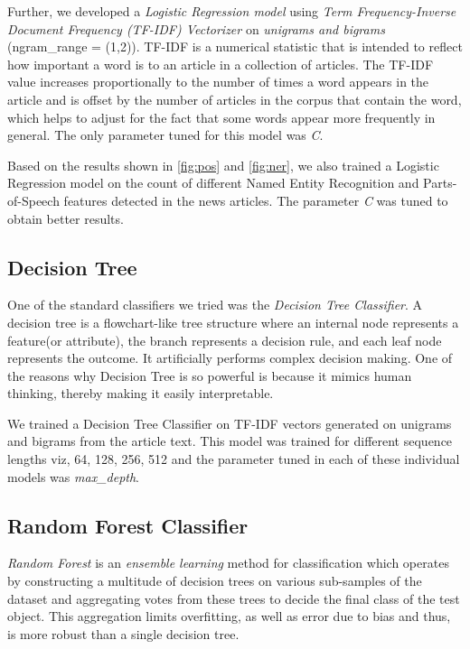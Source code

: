 \documentclass[11pt]{article}
\begin{document}
\medskip
Further, we developed a \textit{Logistic Regression model} using \textit{Term Frequency-Inverse Document Frequency (TF-IDF) Vectorizer} on \textit{unigrams and bigrams} (ngram\_range = (1,2)). TF-IDF is a numerical statistic that is intended to reflect how important a word is to an article in a collection of articles. The TF-IDF value increases proportionally to the number of times a word appears in the article and is offset by the number of articles in the corpus that contain the word, which helps to adjust for the fact that some words appear more frequently in general. The only parameter tuned for this model was \textit{C}.

\medskip
Based on the results shown in \ref{fig:pos} and \ref{fig:ner}, we also trained a Logistic Regression model on the count of different Named Entity 
Recognition and Parts-of-Speech features detected in the news articles. The parameter \textit{C} was tuned to obtain better results.

\subsection{Decision Tree}
One of the standard classifiers we tried was the \textit{Decision Tree Classifier}. A decision tree is a flowchart-like tree structure where an internal node represents a feature(or attribute), the branch represents a decision rule, and each leaf node represents the outcome. It artificially  performs complex decision making. One of the reasons why Decision Tree is so powerful is because it mimics human thinking, thereby making it easily interpretable.

\medskip
We trained a Decision Tree Classifier on TF-IDF vectors generated on unigrams and bigrams from the article text. This model was trained for different sequence lengths viz, 64, 128, 256, 512 and the parameter tuned in each of these individual models was \textit{max\_depth}.

\subsection{Random Forest Classifier}
\textit{Random Forest} is an \textit{ensemble learning} method for classification which operates by constructing a multitude of decision trees on various sub-samples of the dataset and aggregating votes from these trees to decide the final class of the test object. This aggregation limits overfitting, as well as error due to bias and thus, is more robust than a single decision tree.
\end{document}
